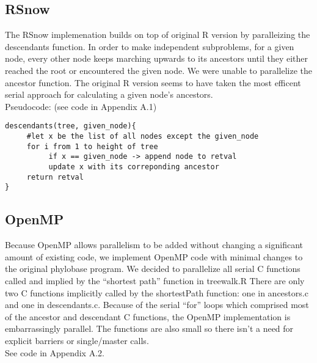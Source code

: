 \documentclass[11pt,letterpaper]{article}
\begin{document}
\subsection{RSnow}
The RSnow implemenation builds on top of original R version by paralleizing the descendants function. 
In order to make independent subproblems, for a given node, every other node keeps marching upwards to its ancestors until they either reached the root or encountered the given node. 
We were unable to parallelize the ancestor function. The original R version seems to have taken the most efficent serial approach for calculating a given node's ancestors. \\

Pseudocode: (see code in Appendix A.1)
\begin{lstlisting}[style=MyR]
descendants(tree, given_node){
     #let x be the list of all nodes except the given_node
     for i from 1 to height of tree
          if x == given_node -> append node to retval
          update x with its correponding ancestor
     return retval
}
\end{lstlisting}

\subsection{OpenMP}
Because OpenMP allows parallelism to be added without changing a significant amount of existing code, we implement OpenMP code with minimal changes to the original phylobase program. 
We decided to parallelize all serial C functions called and implied by the “shortest path” function in treewalk.R
There are only two C functions implicitly called by the shortestPath function: one in ancestors.c and one in descendants.c. 
Because of the serial “for” loops which comprised most of the ancestor and descendant C functions, the OpenMP implementation is embarrassingly parallel. The functions are also small so there isn't a need for explicit barriers or single/master calls.
\\

See code in Appendix A.2.\\
\end{document}
